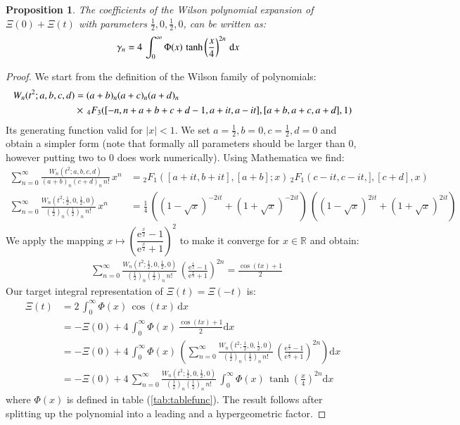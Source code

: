 \documentclass[a4paper,11pt,twoside]{amsart}
\newtheorem{proposition}[theorem]{Proposition}
\newcommand{\verifiedeq}{=}
\newcommand{\defeq}{=}
\newcommand{\verifiedeq}{\stackrel{\checkmark}{=}}
\newcommand{\defeq}{\stackrel{\scriptscriptstyle \textnormal{def}}{=}}
\begin{document}
\begin{proposition}
The coefficients of the Wilson polynomial expansion of $\Xi(0) +\Xi(t)$ with parameters $\frac12,0,\frac12,0$, can be written as:   
\begin{align}
\gamma_n &\verifiedeq 4\,\int_{0}^\infty \Phi(x)\,\tanh\left(\frac{x}{4}\right)^{2n}\, \mathrm{d}x \notag
\end{align}
\end{proposition}
\begin{proof}
We start from the definition of the Wilson family of polynomials:
\begin{align}
 W_n(t^2;a,b,c,d) &\defeq (a+b)_n(a+c)_n(a+d)_n\, \\
  &\times\, {}_4F_3([-n, n+ a+b+c+d-1,a+it, a- it], [a+b, a+c, a+d], 1) \notag
\end{align}
Its generating function valid for $|x| < 1$. We set $a=\frac12,b=0,c=\frac12,d=0$ and obtain a simpler form (note that formally all parameters should be larger than $0$, however putting two to $0$ does work numerically). Using Mathematica we find:
\begin{align}
 \sum_{n=0}^\infty \frac{W_n(t^2;a,b,c,d)}{(a+b)_n(c+d)_n\,n!}\, x^n &\verifiedeq {}_2F_1\left([a+it, b+it],[a+b] ;x\right)\,{}_2F_1\left(c-it, c-it,],[c+d],x\right) \\
 \sum_{n=0}^\infty \frac{W_n\left(t^2;\frac12,0,\frac12,0\right)}{\left(\frac12\right)_n\left(\frac12\right)_n\,n!}\,x^n&\verifiedeq \frac14\,\left((1-\sqrt{x})^{-2it}+(1+\sqrt{x})^{-2it}\right)\,\left((1-\sqrt{x})^{2it}+(1+\sqrt{x})^{2it}\right)
\end{align} 
We apply the mapping $x \mapsto \left(\dfrac{\textrm{e}^{\frac{x}{2}}-1}{\textrm{e}^{\frac{x}{2}}+1}\right)^2$ to make it converge for $x \in \mathbb{R}$ and obtain: 
\begin{align}
 &\sum_{n=0}^\infty \frac{W_n\left(t^2;\frac12,0,\frac12,0\right)}{\left(\frac12\right)_n\left(\frac12\right)_n\,n!}\, \left(\frac{\textrm{e}^{\frac{x}{2}}-1}{\textrm{e}^{\frac{x}{2}}+1}\right)^{2n} \verifiedeq \frac{\cos(tx)+1}{2}
\end{align}
Our target integral representation of $\Xi(t) = \Xi(-t)$ is:
\begin{align}
 \Xi(t) &\verifiedeq 2\,\int_{0}^\infty \Phi(x)\,\cos(t\,x)\, \mathrm{d}x \\
  &\verifiedeq -\Xi(0) +4\,\int_{0}^\infty \Phi(x)\, \frac{\cos(tx)+1}{2}  \mathrm{d}x\\
  &\verifiedeq -\Xi(0)+4\,\int_{0}^\infty \Phi(x)\,\left(\sum_{n=0}^\infty \frac{W_n\left(t^2;\frac12,0,\frac12,0\right)}{\left(\frac12\right)_n\left(\frac12\right)_n\,n!}\, \left(\frac{\textrm{e}^{\frac{x}{2}}-1}{\textrm{e}^{\frac{x}{2}}+1}\right)^{2n}\right) \mathrm{d}x \\
  &\verifiedeq -\Xi(0)+4\, \sum_{n=0}^\infty \frac{W_n\left(t^2;\frac12,0,\frac12,0\right)}{\left(\frac12\right)_n\left(\frac12\right)_n\,n!}\,\int_{0}^\infty \Phi(x)\,\tanh\left(\frac{x}{4}\right)^{2n} \mathrm{d}x
\end{align}
where $\Phi(x)$ is defined in table (\ref{tab:tablefunc}). The result follows after splitting up the polynomial into a leading and a hypergeometric factor.
\end{proof}
\end{document}
